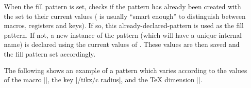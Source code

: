 \begin{command}{\pgfdeclarepatternformonly%
}
    When the fill pattern is set, \pgfname{} checks if the pattern has already
    been created with the  set to their current values
    (\pgfname{} is usually ``smart enough'' to distinguish between macros,
    registers and keys). If so, this already-declared-pattern is used as the
    fill pattern. If not, a new instance of the pattern (which will have a
    unique internal name) is declared using the current values of
    . These values are then saved and the fill pattern set
    accordingly.

    The following shows an example of a pattern which varies according to the
    values of the macro |\size|, the key |/tikz/c radius|, and the \TeX{}
    dimension |\thickness|.
\begin{codeexample}[preamble={\usetikzlibrary{patterns}}]
{}
{}
{\pgfpoint{\size}{\size}}
{
  \pgfsetlinewidth{\thickness}
  \pgfpathcircle{}
}
\newdimen\thickness
{}
\end{codeexample}
\end{command}

